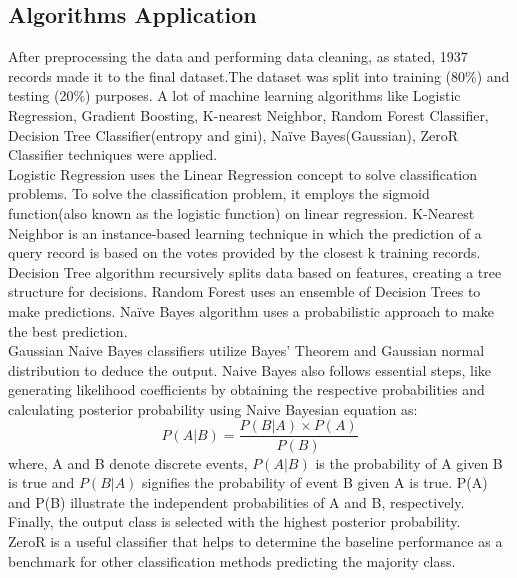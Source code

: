 \documentclass{article}
\begin{document}
\begin{multicols}{2}
\subsection{Algorithms Application}
\hspace*{\parindent}After preprocessing the data and performing data cleaning, as stated, 1937 records made it to the final dataset.The dataset was split into training (80\%) and testing (20\%) purposes. A lot of machine learning algorithms like Logistic Regression, Gradient Boosting, K-nearest Neighbor, Random Forest Classifier, Decision Tree Classifier(entropy and gini), Naïve Bayes(Gaussian), ZeroR Classifier techniques were applied.\\
\hspace*{\parindent}Logistic Regression uses the Linear Regression concept to solve classification problems. To solve the classification problem, it employs the sigmoid function(also known as the logistic function) on linear regression. K-Nearest Neighbor is an instance-based learning technique in which the prediction of a query record is based on the votes provided by the closest k training records. Decision Tree algorithm recursively splits data based on features, creating a tree structure for decisions. Random Forest uses an ensemble of Decision Trees to make predictions. Naïve Bayes algorithm uses a probabilistic approach to make the best prediction.\\
\hspace*{\parindent}Gaussian Naive Bayes classifiers utilize Bayes’ Theorem and Gaussian normal distribution to deduce the output. Naive Bayes also follows essential steps, like generating likelihood coefficients by obtaining the respective probabilities and calculating posterior probability using Naive Bayesian equation as: 
\begin{equation}
     P(A|B) = \frac{P(B|A)\times P(A)}{P(B)}
     \label{naivebayes}
\end{equation}
where, A and B denote discrete events, $P(A|B)$ is the probability of A
given B is true and $P(B|A)$ signifies the probability of event B given A
is true. P(A) and P(B) illustrate the independent probabilities of A and
B, respectively. Finally, the output class is selected with the highest
posterior probability. \\
\hspace*{\parindent}ZeroR is a useful classifier that helps to determine the baseline performance as a benchmark for other classification
methods predicting the majority class.


\end{multicols}
\end{document}
